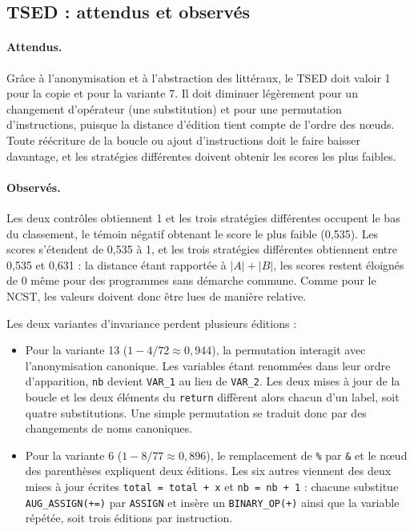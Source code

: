\documentclass[12pt,a4paper,oneside]{report}
\begin{document}
\subsection{TSED : attendus et observés}

\paragraph{Attendus.}
Grâce à l'anonymisation et à l'abstraction des littéraux, le TSED doit valoir
1 pour la copie et pour la variante 7. Il doit diminuer légèrement pour un
changement d'opérateur (une substitution) et pour une permutation
d'instructions, puisque la distance d'édition tient compte de l'ordre des
nœuds. Toute réécriture de la boucle ou ajout d'instructions doit le faire
baisser davantage, et les stratégies différentes doivent obtenir les scores
les plus faibles.

\paragraph{Observés.}
Les deux contrôles obtiennent 1 et les trois stratégies différentes occupent
le bas du classement, le témoin négatif obtenant le score le plus faible
(0,535). Les scores s'étendent de 0,535 à 1, et les trois stratégies
différentes obtiennent entre 0,535 et 0,631 : la distance étant rapportée à
$|A| + |B|$, les scores restent éloignés de 0 même pour des programmes sans
démarche commune. Comme pour le NCST, les valeurs doivent donc être lues de
manière relative.

Les deux variantes d'invariance perdent plusieurs éditions :
\begin{itemize}
  \item Pour la variante 13 ($1 - 4/72 \approx 0{,}944$), la permutation interagit
        avec l'anonymisation canonique. Les variables étant renommées dans
        leur ordre d'apparition, \texttt{nb} devient \texttt{VAR\_1} au lieu
        de \texttt{VAR\_2}. Les deux mises à jour de la boucle et les deux
        éléments du \texttt{return} diffèrent alors chacun d'un label, soit
        quatre substitutions. Une simple permutation se traduit donc par des
        changements de noms canoniques.
  \item Pour la variante 6 ($1 - 8/77 \approx 0{,}896$), le remplacement de
        \texttt{\%} par \texttt{\&} et le nœud des parenthèses expliquent
        deux éditions. Les six autres viennent des deux mises à jour écrites
        \texttt{total = total + x} et \texttt{nb = nb + 1} : chacune
        substitue \texttt{AUG\_ASSIGN(+=)} par \texttt{ASSIGN} et insère un
        \texttt{BINARY\_OP(+)} ainsi que la variable répétée, soit trois
        éditions par instruction.
\end{itemize}
\end{document}
